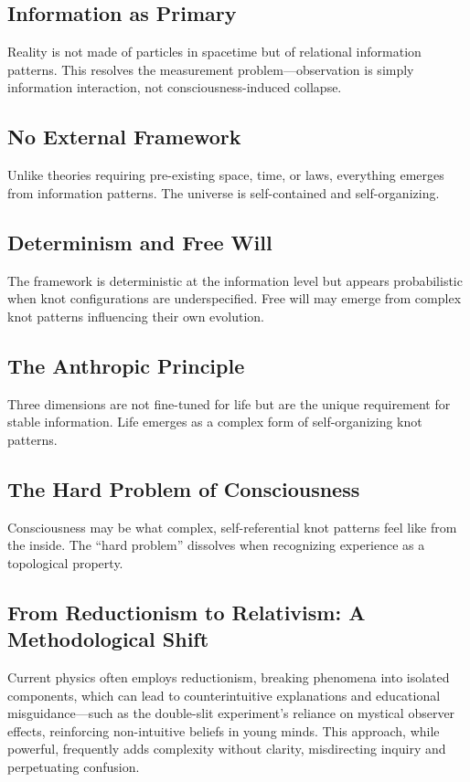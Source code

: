 \documentclass{article}
\begin{document}
\subsection{Information as Primary}
Reality is not made of particles in spacetime but of relational information patterns. This resolves the measurement problem—observation is simply information interaction, not consciousness-induced collapse.

\subsection{No External Framework}
Unlike theories requiring pre-existing space, time, or laws, everything emerges from information patterns. The universe is self-contained and self-organizing.

\subsection{Determinism and Free Will}
The framework is deterministic at the information level but appears probabilistic when knot configurations are underspecified. Free will may emerge from complex knot patterns influencing their own evolution.

\subsection{The Anthropic Principle}
Three dimensions are not fine-tuned for life but are the unique requirement for stable information. Life emerges as a complex form of self-organizing knot patterns.

\subsection{The Hard Problem of Consciousness}
Consciousness may be what complex, self-referential knot patterns feel like from the inside. The ``hard problem'' dissolves when recognizing experience as a topological property.

\subsection{From Reductionism to Relativism: A Methodological Shift}
Current physics often employs reductionism, breaking phenomena into isolated components, which can lead to counterintuitive explanations and educational misguidance—such as the double-slit experiment's reliance on mystical observer effects, reinforcing non-intuitive beliefs in young minds. This approach, while powerful, frequently adds complexity without clarity, misdirecting inquiry and perpetuating confusion.
\end{document}
